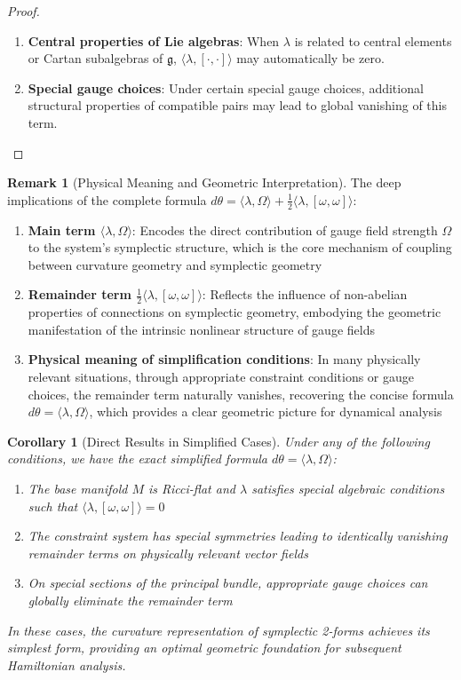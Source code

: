 \documentclass[a4paper,12pt]{extarticle}
\newtheorem{corollary}[theorem]{Corollary}
\theoremstyle{definition}
\newtheorem{remark}{Remark}
\begin{document}
\begin{proof}
\begin{enumerate}
\item \textbf{Central properties of Lie algebras}: When $\lambda$ is related to central elements or Cartan subalgebras of $\mathfrak{g}$, $\langle\lambda, [\cdot, \cdot]\rangle$ may automatically be zero.

\item \textbf{Special gauge choices}: Under certain special gauge choices, additional structural properties of compatible pairs may lead to global vanishing of this term.
\end{enumerate}

\end{proof}

\begin{remark}[Physical Meaning and Geometric Interpretation]
The deep implications of the complete formula $d\theta = \langle\lambda, \Omega\rangle + \frac{1}{2}\langle\lambda, [\omega, \omega]\rangle$:
\begin{enumerate}
\item \textbf{Main term $\langle\lambda, \Omega\rangle$}: Encodes the direct contribution of gauge field strength $\Omega$ to the system's symplectic structure, which is the core mechanism of coupling between curvature geometry and symplectic geometry
\item \textbf{Remainder term $\frac{1}{2}\langle\lambda, [\omega, \omega]\rangle$}: Reflects the influence of non-abelian properties of connections on symplectic geometry, embodying the geometric manifestation of the intrinsic nonlinear structure of gauge fields
\item \textbf{Physical meaning of simplification conditions}: In many physically relevant situations, through appropriate constraint conditions or gauge choices, the remainder term naturally vanishes, recovering the concise formula $d\theta = \langle\lambda, \Omega\rangle$, which provides a clear geometric picture for dynamical analysis
\end{enumerate}
\end{remark}

\begin{corollary}[Direct Results in Simplified Cases]
Under any of the following conditions, we have the exact simplified formula $d\theta = \langle\lambda, \Omega\rangle$:
\begin{enumerate}
\item The base manifold $M$ is Ricci-flat and $\lambda$ satisfies special algebraic conditions such that $\langle\lambda, [\omega, \omega]\rangle = 0$
\item The constraint system has special symmetries leading to identically vanishing remainder terms on physically relevant vector fields
\item On special sections of the principal bundle, appropriate gauge choices can globally eliminate the remainder term
\end{enumerate}
In these cases, the curvature representation of symplectic 2-forms achieves its simplest form, providing an optimal geometric foundation for subsequent Hamiltonian analysis.
\end{corollary}
\end{document}
